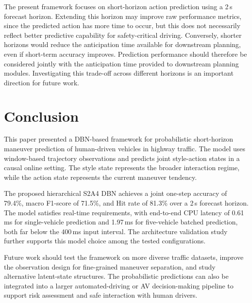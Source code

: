 \documentclass[upint,subscriptcorrection,varvw,hyphenate,balance,greek,russian,vietnamese,german]{asmeconf} %
\begin{document}
The present framework focuses on short-horizon action prediction using a 2\,s forecast horizon. 
Extending this horizon may improve raw performance metrics, since the predicted action has more time to occur, 
but this does not necessarily reflect better predictive capability for safety-critical driving. 
Conversely, shorter horizons would reduce the anticipation time available for downstream planning, even if short-term accuracy improves. 
Prediction performance should therefore be considered jointly with the anticipation time provided to downstream planning modules. 
Investigating this trade-off across different horizons is an important direction for future work.

\section{Conclusion}
This paper presented a DBN-based framework for probabilistic short-horizon maneuver prediction of human-driven vehicles in highway traffic. 
The model uses window-based trajectory observations and predicts joint style-action states in a causal online setting. 
The style state represents the broader interaction regime, while the action state represents the current maneuver tendency.

The proposed hierarchical S2A4 DBN achieves a joint one-step accuracy of 79.4\%, macro F1-score of 71.5\%, and Hit rate of 81.3\% over a 2\,s forecast horizon. 
The model satisfies real-time requirements, with end-to-end CPU latency of 0.61\,ms for single-vehicle prediction and 1.97\,ms for five-vehicle batched prediction, both far below the 400\,ms input interval.
The architecture validation study further supports this model choice among the tested configurations.

Future work should test the framework on more diverse traffic datasets, improve the observation design for fine-grained maneuver 
separation, and study alternative latent-state structures.  
The probabilistic predictions can also be integrated into a larger automated-driving or AV decision-making pipeline to support 
risk assessment and safe interaction with human drivers.


\nocite{*}%



\clearpage
\end{document}
